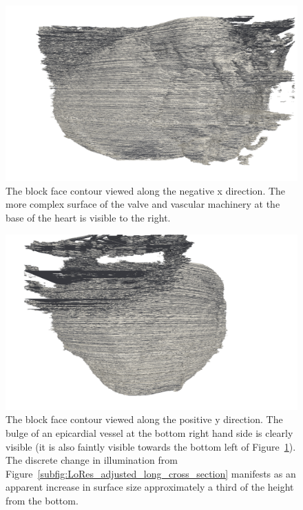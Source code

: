     \begin{figure}
      \centering
      \includegraphics[width=\textheight]{Ch5/Figs/Rat28/contours/LoRes_negative_x}
      \caption{The block face contour viewed along the negative x direction. The more complex surface of the valve and vascular machinery at the base of the heart is visible to the right.}
      \label{fig:LoRes_negative_x}
    \end{figure}
    
    \begin{figure}
      \centering
      \includegraphics[width=\textheight]{Ch5/Figs/Rat28/contours/LoRes_positive_y}
      \caption{The block face contour viewed along the positive y direction. The bulge of an epicardial vessel at the bottom right hand side is clearly visible (it is also faintly visible towards the bottom left of Figure~\ref{fig:LoRes_negative_x}). The discrete change in illumination from Figure~\ref{subfig:LoRes_adjusted_long_cross_section} manifests as an apparent increase in surface size approximately a third of the height from the bottom.}
      \label{fig:LoRes_positive_y}
    \end{figure}
    
